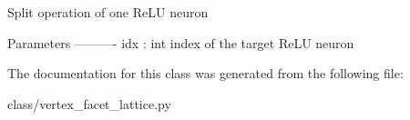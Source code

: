 \begin{DoxyVerb}Split operation of one ReLU neuron

Parameters
----------
idx : int
    index of the target ReLU neuron\end{DoxyVerb}
 

The documentation for this class was generated from the following file\+:\begin{DoxyCompactItemize}
\item 
class/vertex\+\_\+facet\+\_\+lattice.\+py\end{DoxyCompactItemize}
